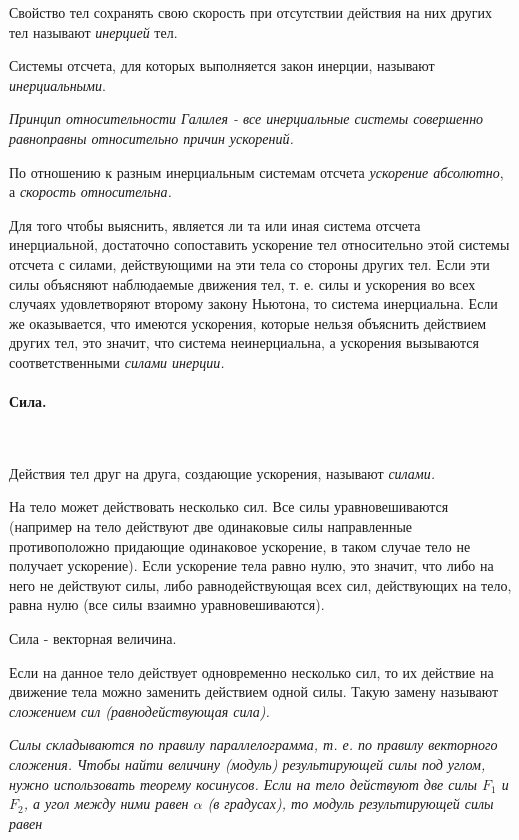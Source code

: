 \documentclass[a4paper,12pt]{article}
\begin{document}
		Свойство тел сохранять свою скорость при отсутствии действия на них
		других тел называют \textit{инерцией} тел.

		Системы отсчета, для которых выполняется закон инерции, называют 
		\textit{инерциальными}.

		\textit{Принцип относительности Галилея - все инерциальные системы 
		совершенно равноправны относительно причин ускорений.}

		По отношению к разным инерциальным системам отсчета \textit{ускорение
		абсолютно}, а \textit{скорость относительна.}

		Для того чтобы выяснить, является ли та или иная система отсчета инерциальной,
		достаточно сопоставить ускорение тел относительно этой системы отсчета с силами,
		действующими на эти тела со стороны других тел. Если эти силы объясняют наблюдаемые
		движения тел, т. е. силы и ускорения во всех случаях удовлетворяют второму закону
		Ньютона, то система инерциальна. Если же оказывается, что имеются ускорения,
		которые нельзя объяснить действием других тел, это значит, что система неинерциальна,
		а ускорения вызываются соответственными \textit{силами инерции.}


		\paragraph{Сила.} \
		
		Действия тел друг на друга, создающие ускорения, называют \textit{силами.}

		На тело может действовать несколько сил. Все силы уравновешиваются (например
		на тело действуют две одинаковые силы направленные противоположно придающие 
		одинаковое ускорение, в таком случае тело не получает ускорение). Если 
		ускорение тела равно нулю, это значит, что либо на него не действуют силы,
		либо равнодействующая всех сил, действующих на тело, равна нулю (все силы
		взаимно уравновешиваются).

		Сила - векторная величина.

		Если на данное тело действует одновременно несколько сил, то их действие
		на движение тела можно заменить действием одной силы. Такую замену называют
		\textit{сложением сил (равнодействующая сила).}

		\textit{Силы складываются по правилу параллелограмма, т. е. по правилу векторного 
		сложения. Чтобы найти величину (модуль) результирующей силы под углом, нужно 
		использовать теорему косинусов. Если на тело действуют две силы $F_1$ и $F_2$, а
		угол между ними равен $\alpha$ (в градусах), то модуль результирующей силы равен}
\end{document}
